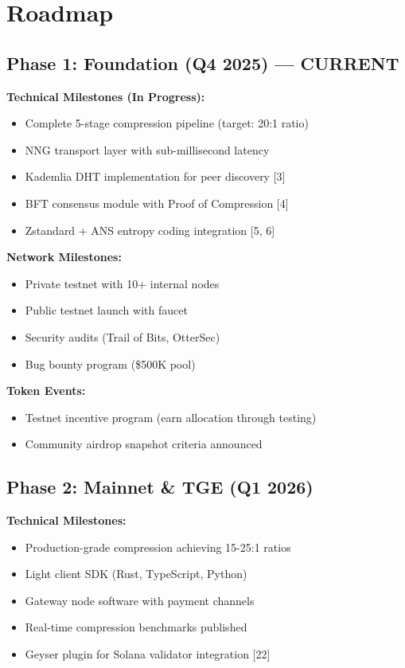 \documentclass[12pt,a4paper]{article}
\begin{document}
\section{Roadmap}

\subsection{Phase 1: Foundation (Q4 2025) — CURRENT}

\textbf{Technical Milestones (In Progress):}
\begin{itemize}
    \item Complete 5-stage compression pipeline (target: 20:1 ratio)
    \item NNG transport layer with sub-millisecond latency
    \item Kademlia DHT implementation for peer discovery [3]
    \item BFT consensus module with Proof of Compression [4]
    \item Zstandard + ANS entropy coding integration [5, 6]
\end{itemize}

\textbf{Network Milestones:}
\begin{itemize}
    \item Private testnet with 10+ internal nodes
    \item Public testnet launch with faucet
    \item Security audits (Trail of Bits, OtterSec)
    \item Bug bounty program (\$500K pool)
\end{itemize}

\textbf{Token Events:}
\begin{itemize}
    \item Testnet incentive program (earn allocation through testing)
    \item Community airdrop snapshot criteria announced
\end{itemize}

\subsection{Phase 2: Mainnet \& TGE (Q1 2026)}

\textbf{Technical Milestones:}
\begin{itemize}
    \item Production-grade compression achieving 15-25:1 ratios
    \item Light client SDK (Rust, TypeScript, Python)
    \item Gateway node software with payment channels
    \item Real-time compression benchmarks published
    \item Geyser plugin for Solana validator integration [22]
\end{itemize}
\end{document}
